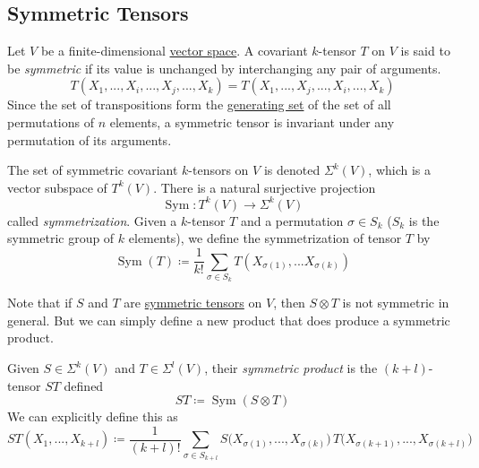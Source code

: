 \documentclass{article}
\DeclareMathOperator{\Sym}{Sym}
\newcounter{definition}[section]
\begin{document}
  \subsection{Symmetric Tensors}
    \begin{definition}
      \label{def:symmetric-tensor}
    Let $V$ be a finite-dimensional \hyperref[lin-def:vector-space]{vector space}. A covariant $k$-tensor $T$ on $V$ is said to be \textit{symmetric} if its value is unchanged by interchanging any pair of arguments. 
    \begin{equation}
      T(X_1,..., X_i, ..., X_j, ..., X_k) = T(X_1,..., X_j, ..., X_i, ..., X_k)
    \end{equation}
    Since the set of transpositions form the \hyperref[alg-def:generating-set]{generating set} of the set of all permutations of $n$ elements, a symmetric tensor is invariant under any permutation of its arguments. 
    \end{definition}

    \begin{definition}[Symmetrization]
      \label{def:symmetrization}
    The set of symmetric covariant $k$-tensors on $V$ is denoted $\Sigma^k (V)$, which is a vector subspace of $T^k (V)$. There is a natural surjective projection 
    \begin{equation}
      \Sym: T^k (V) \to \Sigma^k (V)
    \end{equation}
    called \textit{symmetrization}. Given a $k$-tensor $T$ and a permutation $\sigma \in S_k$ ($S_k$ is the symmetric group of $k$ elements), we define the symmetrization of tensor $T$ by
    \begin{equation}
      \Sym(T) \coloneqq \frac{1}{k!} \sum_{\sigma \in S_k} T (X_{\sigma(1)}, ... X_{\sigma(k)})
    \end{equation}
    \end{definition}

    Note that if $S$ and $T$ are \hyperref[def:symmetric-tensor]{symmetric tensors} on $V$, then $S \otimes T$ is not symmetric in general. But we can simply define a new product that does produce a symmetric product. 

    \begin{definition}
      \label{def:symmetric-product}
    Given $S \in \Sigma^k (V)$ and $T \in \Sigma^l (V)$, their \textit{symmetric product} is the $(k+l)$-tensor $ST$ defined
    \begin{equation}
      S T \coloneqq \Sym(S \otimes T)
    \end{equation}
    We can explicitly define this as 
    \begin{equation}
      ST(X_1, ..., X_{k+l}) \coloneqq \frac{1}{(k+l)!} \sum_{\sigma \in S_{k+l}} S\big(X_{\sigma(1)}, ..., X_{\sigma(k)} \big)\, T\big( X_{\sigma(k+1)}, ..., X_{\sigma(k+l)} \big)
    \end{equation}
    \end{definition}
\end{document}
